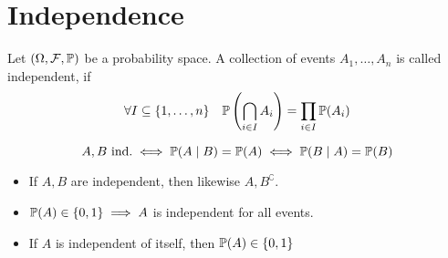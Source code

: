 \section{Independence}
\begin{ddefinition*}
  Let \((\O, \F, \P)\) be a probability space. A collection of events \(A_1, \ldots, A_n\) is called independent, if
  \[\forall I \subseteq \{1, \ldots, n\} \quad \P\left(\bigcap_{i \in I} A_i\right) = \prod_{i \in I} \P(A_i)\]
\end{ddefinition*}
\[A, B \ \text{ind.} \iff \P(A \mid B) = \P(A) \iff \P(B \mid A) = \P(B)\]

\begin{itemize}
  \item If \(A, B\) are independent, then likewise \(A, B^\complement\).
  \item \(\P(A) \in \{0, 1\} \implies A\) is independent for all events.
  \item If \(A\) is independent of itself, then \(\P(A) \in \{0, 1\}\)
\end{itemize}

